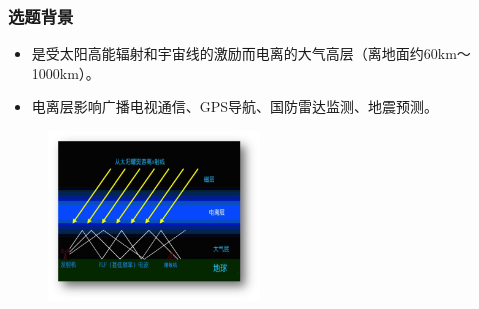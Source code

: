 \documentclass[notheorems,mathserif,table,compress]{beamer}  %
\begin{document}

\begin{frame}
  \frametitle{选题背景}
  \begin{itemize}
  \item  {\color{blue}{电离层}}是受太阳高能辐射和宇宙线的激励而电离的大气高层（离地面约60km～1000km）。
  \item 电离层影响广播电视通信、GPS导航、国防雷达监测、地震预测。
  \end{itemize}
\begin{figure}[!htb] %
\centering
\includegraphics[width=0.5\textwidth]{电离图.png}
\label{fig:2}
\end{figure}
\end{frame}
\end{document}
